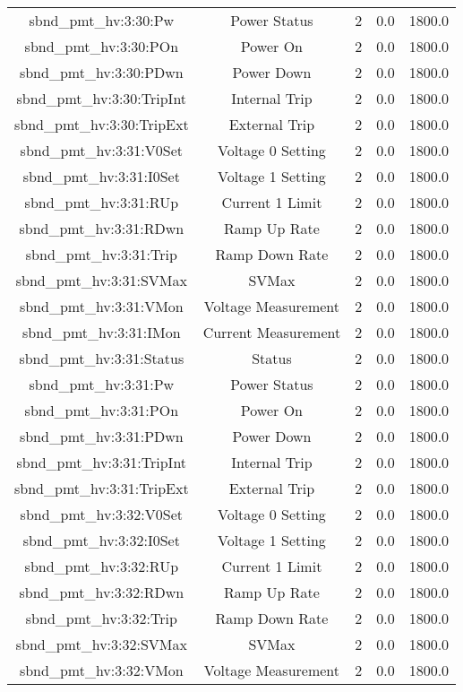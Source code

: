 \begin{center}
\begin{longtable}{c | c c c c }
sbnd\_pmt\_hv:3:30:Pw & Power Status & 2 & 0.0 & 1800.0\\ 
sbnd\_pmt\_hv:3:30:POn & Power On & 2 & 0.0 & 1800.0\\ 
sbnd\_pmt\_hv:3:30:PDwn & Power Down & 2 & 0.0 & 1800.0\\ 
sbnd\_pmt\_hv:3:30:TripInt & Internal Trip & 2 & 0.0 & 1800.0\\ 
sbnd\_pmt\_hv:3:30:TripExt & External Trip & 2 & 0.0 & 1800.0\\ 
sbnd\_pmt\_hv:3:31:V0Set & Voltage 0 Setting & 2 & 0.0 & 1800.0\\ 
sbnd\_pmt\_hv:3:31:I0Set & Voltage 1 Setting & 2 & 0.0 & 1800.0\\ 
sbnd\_pmt\_hv:3:31:RUp & Current 1 Limit & 2 & 0.0 & 1800.0\\ 
sbnd\_pmt\_hv:3:31:RDwn & Ramp Up Rate & 2 & 0.0 & 1800.0\\ 
sbnd\_pmt\_hv:3:31:Trip & Ramp Down Rate & 2 & 0.0 & 1800.0\\ 
sbnd\_pmt\_hv:3:31:SVMax & SVMax & 2 & 0.0 & 1800.0\\ 
sbnd\_pmt\_hv:3:31:VMon & Voltage Measurement & 2 & 0.0 & 1800.0\\ 
sbnd\_pmt\_hv:3:31:IMon & Current Measurement & 2 & 0.0 & 1800.0\\ 
sbnd\_pmt\_hv:3:31:Status & Status & 2 & 0.0 & 1800.0\\ 
sbnd\_pmt\_hv:3:31:Pw & Power Status & 2 & 0.0 & 1800.0\\ 
sbnd\_pmt\_hv:3:31:POn & Power On & 2 & 0.0 & 1800.0\\ 
sbnd\_pmt\_hv:3:31:PDwn & Power Down & 2 & 0.0 & 1800.0\\ 
sbnd\_pmt\_hv:3:31:TripInt & Internal Trip & 2 & 0.0 & 1800.0\\ 
sbnd\_pmt\_hv:3:31:TripExt & External Trip & 2 & 0.0 & 1800.0\\ 
sbnd\_pmt\_hv:3:32:V0Set & Voltage 0 Setting & 2 & 0.0 & 1800.0\\ 
sbnd\_pmt\_hv:3:32:I0Set & Voltage 1 Setting & 2 & 0.0 & 1800.0\\ 
sbnd\_pmt\_hv:3:32:RUp & Current 1 Limit & 2 & 0.0 & 1800.0\\ 
sbnd\_pmt\_hv:3:32:RDwn & Ramp Up Rate & 2 & 0.0 & 1800.0\\ 
sbnd\_pmt\_hv:3:32:Trip & Ramp Down Rate & 2 & 0.0 & 1800.0\\ 
sbnd\_pmt\_hv:3:32:SVMax & SVMax & 2 & 0.0 & 1800.0\\ 
sbnd\_pmt\_hv:3:32:VMon & Voltage Measurement & 2 & 0.0 & 1800.0\\ 

\end{longtable}
\end{center}
